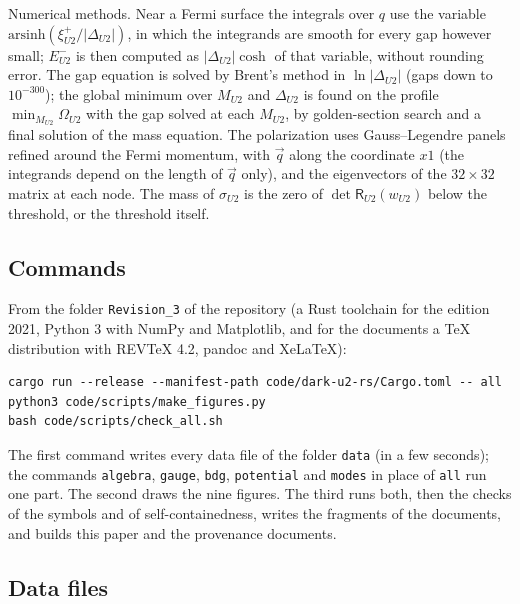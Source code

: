 Numerical methods. Near a Fermi surface the integrals over $q$ use the variable
$\mathrm{arsinh}(\xi^+_{U2}/|\Delta_{U2}|)$, in which the integrands are smooth for every gap however
small; $E^-_{U2}$ is then computed as $|\Delta_{U2}|\cosh$ of that variable, without rounding error. The
gap equation is solved by Brent's method in $\ln|\Delta_{U2}|$ (gaps down to $10^{-300}$); the global
minimum over $M_{U2}$ and $\Delta_{U2}$ is found on the profile $\min_{M_{U2}}\Omega_{U2}$ with the gap
solved at each $M_{U2}$, by golden-section search and a final solution of the mass equation. The
polarization uses Gauss--Legendre panels refined around the Fermi momentum, with $\vec q$ along the
coordinate $x1$ (the integrands depend on the length of $\vec q$ only), and the eigenvectors of the
$32\times32$ matrix at each node. The mass of $\sigma_{U2}$ is the zero of $\det\mathsf R_{U2}(w_{U2})$
below the threshold, or the threshold itself.

\subsection{Commands}

From the folder \texttt{Revision\_3} of the repository (a Rust toolchain for the edition 2021,
Python 3 with NumPy and Matplotlib, and for the documents a TeX distribution with REVTeX 4.2, pandoc
and XeLaTeX):
\begin{verbatim}
cargo run --release --manifest-path code/dark-u2-rs/Cargo.toml -- all
python3 code/scripts/make_figures.py
bash code/scripts/check_all.sh
\end{verbatim}
The first command writes every data file of the folder \texttt{data} (in a few seconds); the commands \texttt{algebra}, \texttt{gauge}, \texttt{bdg}, \texttt{potential} and
\texttt{modes} in place of \texttt{all} run one part. The second draws the nine figures. The third
runs both, then the checks of the symbols and of self-containedness, writes the fragments of the
documents, and builds this paper and the provenance documents.

\subsection{Data files}

